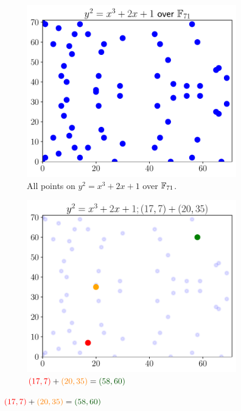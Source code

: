 \begin{figure}[p]
\centering
    \begin{subfigure}[t]{0.45\textwidth}
    \includegraphics[width=\textwidth]{plots/ec_finite/ec_finite_F_71_2_1_addition_base.pdf}
    \caption{All points on $y^{2} = x^{3} + 2x + 1$ over $\mathbb{F}_{71}$.}
    \end{subfigure}
    \begin{subfigure}[t]{0.45\textwidth}
    \includegraphics[width=\textwidth]{plots/ec_finite/ec_finite_F_71_2_1_addition_20_35.pdf}
    \caption{$\textcolor{red}{\parens{17,7}}
        + \textcolor{orange}{\parens{20,35}}
        = \textcolor[rgb]{0,0.33,0}{\parens{58,60}}$}
    \end{subfigure}


\end{figure}
